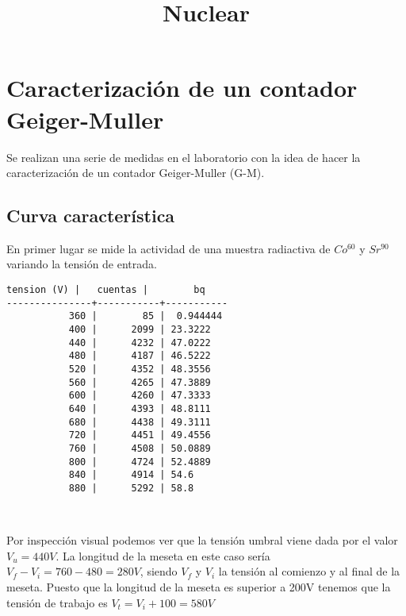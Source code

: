 \documentclass[11pt]{article}
\title{Nuclear}
\begin{document}
    
    \maketitle
    
    

    
    \hypertarget{caracterizaciuxf3n-de-un-contador-geiger-muller}{%
\section{Caracterización de un contador
Geiger-Muller}\label{caracterizaciuxf3n-de-un-contador-geiger-muller}}

Se realizan una serie de medidas en el laboratorio con la idea de hacer
la caracterización de un contador Geiger-Muller (G-M).

    \hypertarget{curva-caracteruxedstica}{%
\subsection{Curva característica}\label{curva-caracteruxedstica}}

En primer lugar se mide la actividad de una muestra radiactiva de
\(Co^{60}\) y \(Sr^{90}\) variando la tensión de entrada.

    \begin{Verbatim}[commandchars=\\\{\}]
   tension (V) |   cuentas |        bq
---------------+-----------+-----------
           360 |        85 |  0.944444
           400 |      2099 | 23.3222
           440 |      4232 | 47.0222
           480 |      4187 | 46.5222
           520 |      4352 | 48.3556
           560 |      4265 | 47.3889
           600 |      4260 | 47.3333
           640 |      4393 | 48.8111
           680 |      4438 | 49.3111
           720 |      4451 | 49.4556
           760 |      4508 | 50.0889
           800 |      4724 | 52.4889
           840 |      4914 | 54.6
           880 |      5292 | 58.8
    \end{Verbatim}

    \begin{center}
    \end{center}
    { \hspace*{\fill} \\}
     
            
    
    Por inspección visual podemos ver que la tensión umbral viene dada por
el valor \(V_u=440V\). La longitud de la meseta en este caso sería
\(V_f - V_i = 760 - 480 = 280V\), siendo \(V_f\) y \(V_i\) la tensión al
comienzo y al final de la meseta. Puesto que la longitud de la meseta es
superior a 200V tenemos que la tensión de trabajo es
\(V_t = V_i + 100 =580V\)
\end{document}
